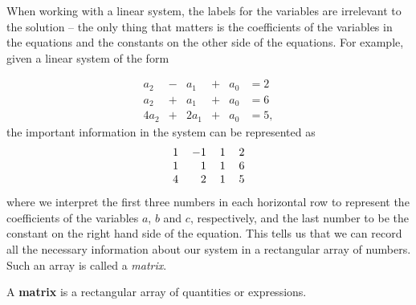 
When working with a linear system, the labels for the variables are irrelevant to the solution -- the only thing that matters is the coefficients of the variables in the equations and the constants on the other side of the equations. For example, given a linear system of the form

\begin{equation}  \label{eq:PA_1}
\begin{alignedat}{4}
a_2 	&{}-{} 	&a_1 	&{}+{}	&a_0 &= 2 \\
a_2 	&{}+{} 	&a_1 	&{}+{} 	&a_0 &= 6 \\
4a_2	&{}+{} 	&2a_1 	&{}+{} 	&a_0	&= 5, 
\end{alignedat}
\end{equation}
the important information in the system can be represented as
\[\begin{tabular}{crcc}
1 &$-1$ &1 &2 \\
1 & 1 &1 &6 \\
4 & 2	&1 &5
\end{tabular}\]
where we interpret the first three numbers in each horizontal row to represent the coefficients of the variables $a$, $b$ and $c$, respectively, and the last number to be the constant on the right hand side of the equation. This tells us that we can record all the necessary information about our system in a rectangular array of numbers. Such an array is called a \emph{matrix}.



\begin{definition} A \textbf{matrix} is a rectangular array of quantities or expressions.
\end{definition}



